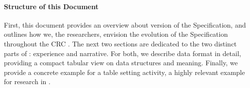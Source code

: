 \paragraph{Structure of this Document}
First, this document provides an overview about version \neemversion of the \neem Specification,
and outlines how we, the \ease researchers, envision the evolution of the \neem Specification
throughout the CRC \ease.
The next two sections are dedicated to the two distinct parts of \neems: experience and narrative.
For both, we describe data format in detail, providing
a compact tabular view on data structures and meaning.
Finally, we provide a concrete example for a table setting activity,
a highly relevant example for research in \ease.


